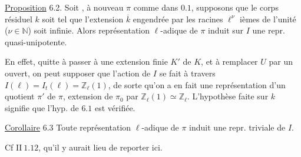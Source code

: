 \uline{Proposition} 6.2. Soit , à nouveau $\pi$ comme dans $0.1$,  supposons que le corps résiduel $k$ soit tel que l'extension  $\overline k$ engendrée par les racines $\ell^\nu$ ièmes de l'unité ($\nu\in\mathbb N$) soit infinie. Alors  représentation $\ell$-adique de $\pi$ induit sur $I$ une repr. quasi-unipotente.

En effet, quitte à passer à une extension finie $K'$ de $K$, et à remplacer $U$ par un ouvert, on peut supposer que l'action de $I$ se fait à travers $I(\ell)=I_t(\ell)=\mathbb Z_\ell(1)$,  de sorte qu'on a en fait une représentation d'un quotient $\pi'$ de $\pi$, extension de $\pi_0$ par $\mathbb Z_\ell(1)\simeq\mathbb Z_\ell$. L'hypothèse faite sur $k$ signifie que l'hyp. de $6.1$ est vérifiée.

\uline{Corollaire} 6.3 Toute représentation $\ell$-adique   de $\pi$ induit une repr.  triviale de $I$.

Cf $\mathrm{II}\ 1.12$, qu'il y aurait lieu de reporter ici.

